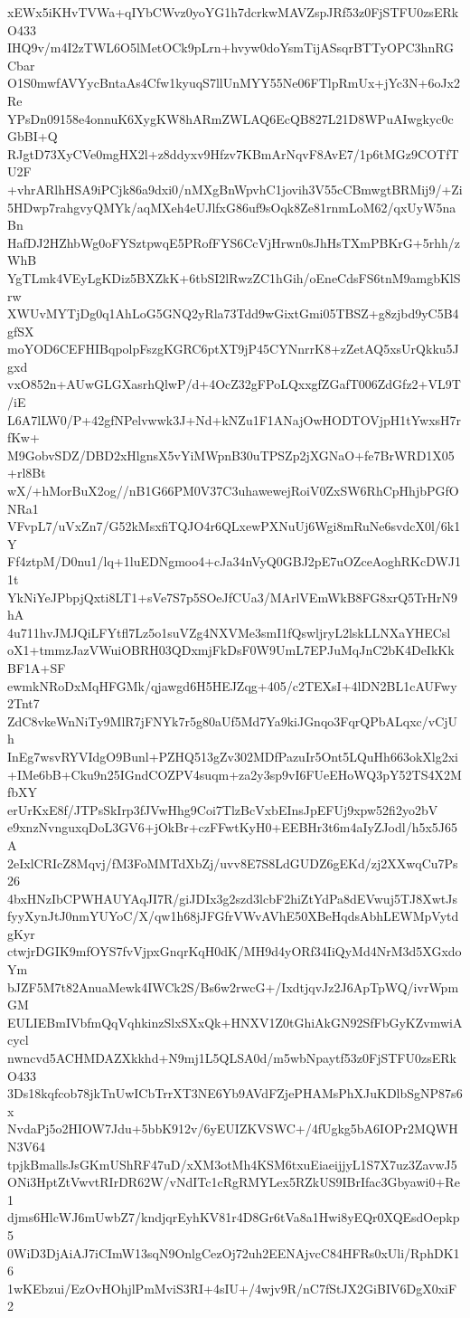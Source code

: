 xEWx5iKHvTVWa+qIYbCWvz0yoYG1h7dcrkwMAVZspJRf53z0FjSTFU0zsERkO433
IHQ9v/m4I2zTWL6O5lMetOCk9pLrn+hvyw0doYsmTijASsqrBTTyOPC3hnRGCbar
O1S0mwfAVYycBntaAs4Cfw1kyuqS7llUnMYY55Ne06FTlpRmUx+jYc3N+6oJx2Re
YPsDn09158e4onnuK6XygKW8hARmZWLAQ6EcQB827L21D8WPuAIwgkyc0cGbBI+Q
RJgtD73XyCVe0mgHX2l+z8ddyxv9Hfzv7KBmArNqvF8AvE7/1p6tMGz9COTfTU2F
+vhrARlhHSA9iPCjk86a9dxi0/nMXgBnWpvhC1jovih3V55cCBmwgtBRMij9/+Zi
5HDwp7rahgvyQMYk/aqMXeh4eUJlfxG86uf9sOqk8Ze81rnmLoM62/qxUyW5naBn
HafDJ2HZhbWg0oFYSztpwqE5PRofFYS6CcVjHrwn0sJhHsTXmPBKrG+5rhh/zWhB
YgTLmk4VEyLgKDiz5BXZkK+6tbSI2lRwzZC1hGih/oEneCdsFS6tnM9amgbKlSrw
XWUvMYTjDg0q1AhLoG5GNQ2yRla73Tdd9wGixtGmi05TBSZ+g8zjbd9yC5B4gfSX
moYOD6CEFHIBqpolpFszgKGRC6ptXT9jP45CYNnrrK8+zZetAQ5xsUrQkku5Jgxd
vxO852n+AUwGLGXasrhQlwP/d+4OcZ32gFPoLQxxgfZGafT006ZdGfz2+VL9T/iE
L6A7lLW0/P+42gfNPelvwwk3J+Nd+kNZu1F1ANajOwHODTOVjpH1tYwxsH7rfKw+
M9GobvSDZ/DBD2xHlgnsX5vYiMWpnB30uTPSZp2jXGNaO+fe7BrWRD1X05+rl8Bt
wX/+hMorBuX2og//nB1G66PM0V37C3uhawewejRoiV0ZxSW6RhCpHhjbPGfONRa1
VFvpL7/uVxZn7/G52kMsxfiTQJO4r6QLxewPXNuUj6Wgi8mRuNe6svdcX0l/6k1Y
Ff4ztpM/D0nu1/lq+1luEDNgmoo4+cJa34nVyQ0GBJ2pE7uOZceAoghRKcDWJ11t
YkNiYeJPbpjQxti8LT1+sVe7S7p5SOeJfCUa3/MArlVEmWkB8FG8xrQ5TrHrN9hA
4u711hvJMJQiLFYtfl7Lz5o1suVZg4NXVMe3smI1fQswljryL2lskLLNXaYHECsl
oX1+tmmzJazVWuiOBRH03QDxmjFkDsF0W9UmL7EPJuMqJnC2bK4DeIkKkBF1A+SF
ewmkNRoDxMqHFGMk/qjawgd6H5HEJZqg+405/c2TEXsI+4lDN2BL1cAUFwy2Tnt7
ZdC8vkeWnNiTy9MlR7jFNYk7r5g80aUf5Md7Ya9kiJGnqo3FqrQPbALqxc/vCjUh
InEg7wsvRYVIdgO9Bunl+PZHQ513gZv302MDfPazuIr5Ont5LQuHh663okXlg2xi
+IMe6bB+Cku9n25IGndCOZPV4suqm+za2y3sp9vI6FUeEHoWQ3pY52TS4X2MfbXY
erUrKxE8f/JTPsSkIrp3fJVwHhg9Coi7TlzBcVxbEInsJpEFUj9xpw52fi2yo2bV
e9xnzNvnguxqDoL3GV6+jOkBr+czFFwtKyH0+EEBHr3t6m4aIyZJodl/h5x5J65A
2eIxlCRIcZ8Mqvj/fM3FoMMTdXbZj/uvv8E7S8LdGUDZ6gEKd/zj2XXwqCu7Ps26
4bxHNzIbCPWHAUYAqJI7R/giJDIx3g2szd3lcbF2hiZtYdPa8dEVwuj5TJ8XwtJs
fyyXynJtJ0nmYUYoC/X/qw1h68jJFGfrVWvAVhE50XBeHqdsAbhLEWMpVytdgKyr
ctwjrDGIK9mfOYS7fvVjpxGnqrKqH0dK/MH9d4yORf34IiQyMd4NrM3d5XGxdoYm
bJZF5M7t82AnuaMewk4IWCk2S/Bs6w2rwcG+/IxdtjqvJz2J6ApTpWQ/ivrWpmGM
EULIEBmIVbfmQqVqhkinzSlxSXxQk+HNXV1Z0tGhiAkGN92SfFbGyKZvmwiAcycl
nwncvd5ACHMDAZXkkhd+N9mj1L5QLSA0d/m5wbNpaytf53z0FjSTFU0zsERkO433
3Ds18kqfcob78jkTnUwICbTrrXT3NE6Yb9AVdFZjePHAMsPhXJuKDlbSgNP87s6x
NvdaPj5o2HIOW7Jdu+5bbK912v/6yEUIZKVSWC+/4fUgkg5bA6IOPr2MQWHN3V64
tpjkBmallsJsGKmUShRF47uD/xXM3otMh4KSM6txuEiaeijjyL1S7X7uz3ZavwJ5
ONi3HptZtVwvtRIrDR62W/vNdITc1cRgRMYLex5RZkUS9IBrIfac3Gbyawi0+Re1
djms6HlcWJ6mUwbZ7/kndjqrEyhKV81r4D8Gr6tVa8a1Hwi8yEQr0XQEsdOepkp5
0WiD3DjAiAJ7iCImW13sqN9OnlgCezOj72uh2EENAjvcC84HFRs0xUli/RphDK16
1wKEbzui/EzOvHOhjlPmMviS3RI+4sIU+/4wjv9R/nC7fStJX2GiBIV6DgX0xiF2
